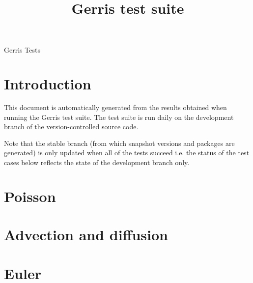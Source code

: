 \documentclass[a4paper]{article}
\title{Gerris test suite}
\begin{document}
\mbox{}\vspace{1cm}
\begin{center}
{\huge Gerris Tests}\\
\vspace{1cm}

\vspace{5mm}
\end{center}

\section{Introduction}

This document is automatically generated from the results obtained
when running the Gerris test suite. The test suite is run daily on the
development branch of the version-controlled source code. 

Note that the stable branch (from which snapshot versions and packages
are generated) is only updated when all of the tests succeed i.e. the
status of the test cases below reflects the state of the development
branch only.

\section{Poisson}










\section{Advection and diffusion}









\section{Euler}









\end{document}
